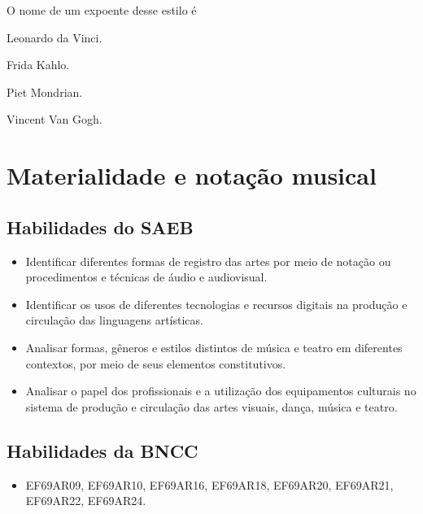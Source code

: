 O nome de um expoente desse estilo é

\begin{escolha}
\item Leonardo da Vinci.

\item Frida Kahlo.

\item Piet Mondrian.

\item Vincent Van Gogh.
\end{escolha}


\chapter{Materialidade e notação musical}

\section{Habilidades do SAEB}

\begin{itemize}
\item Identificar diferentes formas de registro das artes por meio de
notação ou procedimentos e técnicas de áudio e audiovisual.

\item Identificar os usos de diferentes tecnologias e recursos digitais na
produção e circulação das linguagens artísticas.

\item Analisar formas, gêneros e estilos distintos de música e teatro em
diferentes contextos, por meio de seus elementos constitutivos.

\item Analisar o papel dos profissionais e a utilização dos equipamentos
culturais no sistema de produção e circulação das artes visuais, dança,
música e teatro.
\end{itemize}

\section{Habilidades da BNCC}

\begin{itemize}
  \item EF69AR09, EF69AR10, EF69AR16, EF69AR18, EF69AR20, EF69AR21, EF69AR22, EF69AR24.
\end{itemize}

